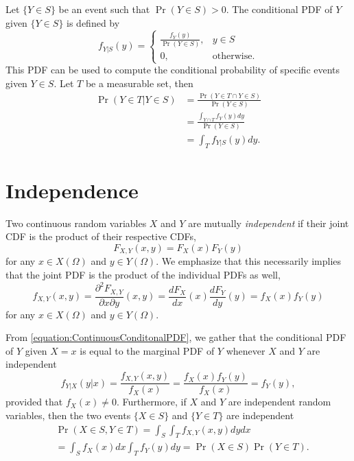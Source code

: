 Let $\{ Y \in S \}$ be an event such that $\Pr (Y \in S) > 0$.
The conditional PDF of $Y$ given $\{ Y \in S \}$ is defined by
\begin{equation*}
f_{Y|S} (y)
= \left\{ \begin{array}{cc} \frac{ f_Y(y) }{\Pr (Y \in S)}, & y \in S \\
0, & \text{otherwise}. \end{array} \right.
\end{equation*}
This PDF can be used to compute the conditional probability of specific events given $Y \in S$.
Let $T$ be a measurable set, then
\begin{equation*}
\begin{split}
\Pr ( Y \in T | Y \in S)
&= \frac{ \Pr ( Y \in T \cap Y \in S) }{ \Pr ( Y \in S) } \\
&= \frac{ \int_{Y \cap T} f_Y(y) dy }{ \Pr ( Y \in S) } \\
&= \int_{T} f_{Y|S} (y) dy .
\end{split}
\end{equation*}



\section{Independence}

Two continuous random variables $X$ and $Y$ are mutually \emph{independent} if their joint CDF is the product of their respective CDFs, 
\begin{equation*}
F_{X,Y} (x,y) = F_X (x) F_Y(y)
\end{equation*}
for any $x \in X(\Omega)$ and $y \in Y(\Omega)$.
We emphasize that this necessarily implies that the joint PDF is the product of the individual PDFs as well,
\begin{equation*}
f_{X,Y} (x,y) = \frac{\partial^2 F_{X,Y}}{\partial x \partial y} (x, y)
= \frac{d F_X}{dx} (x) \frac{d F_Y}{dy} (y)
= f_X (x) f_Y (y)
\end{equation*}
for any $x \in X(\Omega)$ and $y \in Y(\Omega)$.

From \eqref{equation:ContinuousConditonalPDF}, we gather that the conditional PDF of $Y$ given $X=x$ is equal to the marginal PDF of $Y$ whenever $X$ and $Y$ are independent
\begin{equation*}
f_{Y|X} (y|x) = \frac{f_{X,Y} (x, y)}{f_X(x)}
= \frac{f_X (x) f_Y (y)}{f_X(x)} = f_Y (y),
\end{equation*}
provided that $f_X(x) \neq 0$.
Furthermore, if $X$ and $Y$ are independent random variables, then the two events $\{ X \in S \}$ and $\{ Y \in T \}$ are independent
\begin{equation*}
\begin{split}
&\Pr (X \in S, Y \in T) = \int_S \int_T f_{X,Y} (x,y) dy dx \\
&= \int_S f_X (x) dx \int_T f_Y (y) dy
= \Pr (X \in S) \Pr (Y \in T).
\end{split}
\end{equation*}

